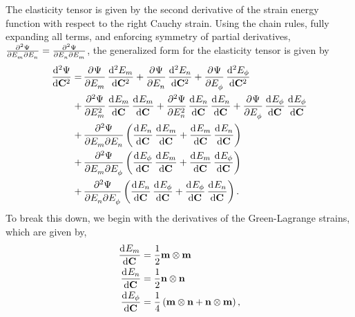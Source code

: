     The elasticity tensor is given by the second derivative of the strain energy function with respect to the right Cauchy strain. Using the chain rules, fully expanding all terms, and enforcing symmetry of partial derivatives, $\md{\Psi}{2}{E_m}{}{E_n}{} = \md{\Psi}{2}{E_n}{}{E_m}{}$, the generalized form for the elasticity tensor is given by 
\begin{equation} \label{eqn:generalizedelasticityform}
\begin{aligned}
\dod[2]{\Psi}{\mathbf{C}} =& 
	\dpd{\Psi}{E_m} \dod[2]{E_m}{\mathbf{C}} 
    + \dpd{\Psi}{E_n} \dod[2]{E_n}{\mathbf{C}}
    + \dpd{\Psi}{E_\phi} \dod[2]{E_\phi}{\mathbf{C}} \\
+& \dpd[2]{\Psi}{E_m} \dod{E_m}{\mathbf{C}}\dod{E_m}{\mathbf{C}} 
	+ \dpd[2]{\Psi}{E_n} \dod{E_n}{\mathbf{C}} \dod{E_n}{\mathbf{C}} 
    + \dpd{\Psi}{E_\phi} \dod{E_\phi}{\mathbf{C}} \dod{E_\phi}{\mathbf{C}} \\
+& \dmd{\Psi}{2}{E_m}{}{E_n}{} \left(\dod{E_n}{\mathbf{C}} \dod{E_m}{\mathbf{C}} + \dod{E_m}{\mathbf{C}} \dod{E_n}{\mathbf{C}}\right)   \\
    +& \dmd{\Psi}{2}{E_m}{}{E_\phi}{} \left(\dod{E_\phi}{\mathbf{C}} \dod{E_m}{\mathbf{C}} + \dod{E_m}{\mathbf{C}} \dod{E_\phi}{\mathbf{C}}\right)  \\
    +& \dmd{\Psi}{2}{E_n}{}{E_\phi}{} \left(\dod{E_n}{\mathbf{C}} \dod{E_\phi}{\mathbf{C}} + \dod{E_\phi}{\mathbf{C}} \dod{E_n}{\mathbf{C}}\right).  \\
\end{aligned}
\end{equation}
To break this down, we begin with the derivatives of the Green-Lagrange strains, which are given by,
\begin{equation}\label{eqn:partialgreens}
\begin{aligned}
\dod{E_m}{\mathbf{C}} &= \frac{1}{2} \mathbf{m}\otimes\mathbf{m}	\\
\dod{E_n}{\mathbf{C}} &= \frac{1}{2} \mathbf{n}\otimes\mathbf{n} \\
\dod{E_\phi}{\mathbf{C}} &= \frac{1}{4} \left(\mathbf{m}\otimes\mathbf{n} + \mathbf{n}\otimes\mathbf{m} \right),
\end{aligned}
\end{equation}
